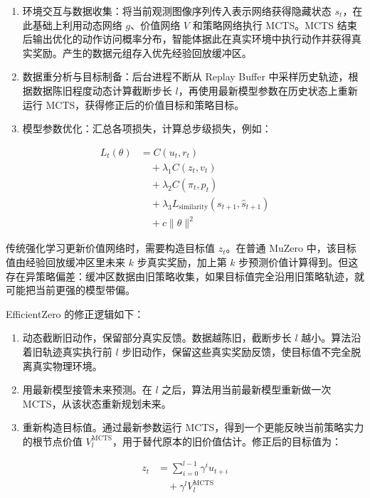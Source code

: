 \begin{enumerate}
\def\labelenumi{\arabic{enumi}.}
\tightlist
\item
  环境交互与数据收集：将当前观测图像序列传入表示网络获得隐藏状态 \(s_t\)，在此基础上利用动态网络 \(g\)、价值网络 \(V\) 和策略网络执行 MCTS。MCTS 结束后输出优化的动作访问概率分布，智能体据此在真实环境中执行动作并获得真实奖励。产生的数据元组存入优先经验回放缓冲区。
\item
  数据重分析与目标制备：后台进程不断从 Replay Buffer 中采样历史轨迹，根据数据陈旧程度动态计算截断步长 \(l\)，再使用最新模型参数在历史状态上重新运行 MCTS，获得修正后的价值目标和策略目标。
\item
  模型参数优化：汇总各项损失，计算总步级损失，例如：
\end{enumerate}

\[
\begin{aligned}
L_t(\theta)
&= C\left(u_t, r_t\right)
\\
&\quad + \lambda_1 C\left(z_t, v_t\right)
\\
&\quad + \lambda_2 C\left(\pi_t, p_t\right)
\\
&\quad + \lambda_3 L_{\mathrm{similarity}}(s_{t+1}, \hat{s}_{t+1})
\\
&\quad + c \lVert \theta \rVert^2
\end{aligned}
\]

传统强化学习更新价值网络时，需要构造目标值 \(z_t\)。在普通 MuZero 中，该目标值由经验回放缓冲区里未来 \(k\) 步真实奖励，加上第 \(k\) 步预测价值计算得到。但这存在异策略偏差：缓冲区数据由旧策略收集，如果目标值完全沿用旧策略轨迹，就可能把当前更强的模型带偏。

EfficientZero 的修正逻辑如下：

\begin{enumerate}
\def\labelenumi{\arabic{enumi}.}
\tightlist
\item
  动态截断旧动作，保留部分真实反馈。数据越陈旧，截断步长 \(l\) 越小。算法沿着旧轨迹真实执行前 \(l\) 步旧动作，保留这些真实奖励反馈，使目标值不完全脱离真实物理环境。
\item
  用最新模型接管未来预测。在 \(l\) 之后，算法用当前最新模型重新做一次 MCTS，从该状态重新规划未来。
\item
  重新构造目标值。通过最新参数运行 MCTS，得到一个更能反映当前策略实力的根节点价值 \(V_l^{\mathrm{MCTS}}\)，用于替代原本的旧价值估计。修正后的目标值为：
\end{enumerate}

\[
\begin{aligned}
z_t
&= \sum_{i=0}^{l-1} \gamma^i u_{t+i}
\\
&\quad + \gamma^l V_l^{\mathrm{MCTS}}
\end{aligned}
\]

